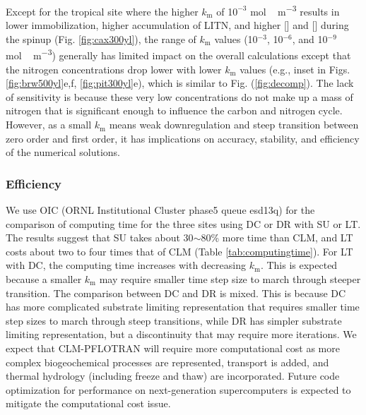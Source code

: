 \documentclass[gmd, manuscript]{copernicus}
\begin{document}
Except for the tropical site where the higher $k_\text{m}$ of 1$0^{-3}$
\unit{mol\,m^{-3}} results in lower immobilization, higher accumulation of
LITN, and  higher [] and [] during the spinup (Fig.
\ref{fig:cax300yl}), the range of $k_\text{m}$ values (10$^{-3}$, 10$^{-6}$,
and 10$^{-9}$ \unit{mol\,m^{-3}}) generally has limited impact on the overall
calculations except that the nitrogen concentrations drop lower with lower
$k_\text{m}$ values (e.g., inset in Figs. \ref{fig:brw500yl}e,f,
\ref{fig:pit300yl}e), which is similar to Fig. (\ref{fig:decomp}). The lack of
sensitivity is because these very low concentrations do not make up a mass of
nitrogen that is significant enough to influence the carbon and nitrogen cycle.
However, as a small $k_\text{m}$ means weak downregulation and steep transition
between zero order and first order, it has implications on accuracy,
stability, and efficiency of the numerical solutions.

\subsubsection{Efficiency}
We use OIC (ORNL Institutional Cluster phase5 queue esd13q) for the comparison of
computing time for the three sites using DC or DR with SU or LT. The results
suggest that SU takes about 30$\sim$80\% more time than CLM, and LT costs about
two to four times that of CLM (Table \ref{tab:computingtime}). For LT with DC, the
computing time increases with decreasing $k_\text{m}$. This is expected because
a smaller $k_\text{m}$ may require smaller time step size to march through
steeper transition. The
comparison between DC and DR is mixed. This is because DC has more complicated
substrate limiting representation that requires smaller time step sizes to march
through steep transitions, while DR has simpler substrate limiting
representation, but a discontinuity that may require more iterations. We expect
that CLM-PFLOTRAN will require more computational cost as more complex
biogeochemical processes are represented, transport is added, and thermal
hydrology (including freeze and thaw) are incorporated. Future code
optimization for performance on next-generation supercomputers is expected to
mitigate the computational cost issue. 
\end{document}
